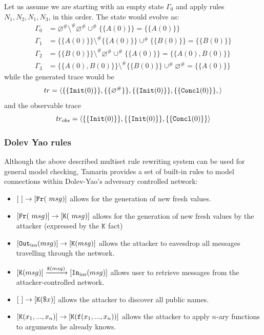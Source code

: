\documentclass{article}
\newcommand{\mono}[1]{\textrm{\tt #1}}
\begin{document}
Let us assume we are starting with an empty state $\Gamma_0$ and apply rules $N_1, N_2, N_1, N_3$, in this order. The state would evolve as:
\begin{align*}
    \Gamma_0 &= \varnothing^{\#} \setminus^{\#} \varnothing^{\#} \cup^{\#} \{\{A(0)\}\} = \{\{A(0)\}\}\\
    \Gamma_1 &= \{\{A(0)\}\} \setminus^{\#} \{\{A(0)\}\} \cup^{\#} \{\{B(0)\}\} = \{\{B(0)\}\}\\
    \Gamma_2 &= \{\{B(0)\}\} \setminus^{\#} \varnothing^{\#} \cup^{\#} \{\{A(0)\}\} = \{\{A(0), B(0)\}\}\\
    \Gamma_3 &= \{\{A(0), B(0)\}\} \setminus^{\#} \{\{B(0)\}\} \cup^{\#} \varnothing^{\#} = \{\{A(0)\}\}
\end{align*}
while the generated trace would be
\begin{equation*}
    tr = \langle \{\{\mono{Init}(0)\}\}, \{\{\varnothing^{\#}\}\}, \{\{\mono{Init}(0)\}\}, \{\{\mono{Concl}(0)\}\},\rangle
\end{equation*}
and the observable trace
\begin{equation*}
    tr_{obs} = \langle \{\{\mono{Init}(0)\}\}, \{\{\mono{Init}(0)\}\}, \{\{\mono{Concl}(0)\}\}\rangle
\end{equation*}

\subsubsection{Dolev Yao rules}
Although the above described multiset rule rewriting system can be used for general model checking, Tamarin provides a set of built-in rules to model connections within Dolev-Yao's adversary controlled network:

\begin{itemize}
    \item $[ \ ] \to [ \mono{Fr}(~msg) ]$ allows for the generation of new fresh values.
    \item $[ \mono{Fr}(~msg) ] \to [ \mono{K}(~msg) ]$ allows for the generation of new fresh values by the attacker (expressed by the $\mono{K}$ fact)
    \item $[ \mono{Out}_{\textrm{ins}}(msg) ] \to [ \mono{K}(msg) ]$ allows the attacker to eavesdrop all messages travelling through the network. 
    \item $[ \mono{K}(msg) ] \xrightarrow{\mono{K}(msg)} [ \mono{In}_{\textrm{ins}}(msg) ]$ allows user to retrieve messages from the attacker-controlled network.
    \item $[ \ ] \to [ \mono{K}(\$x) ]$ allows the attacker to discover all public names.
    \item $[ \mono{K}(x_1,...,x_n) ] \to [ \mono{K}(\mono{f}(x_1,...,x_n)) ]$ allows the attacker to apply $n$-ary functions to arguments he already knows.
\end{itemize}
\end{document}
